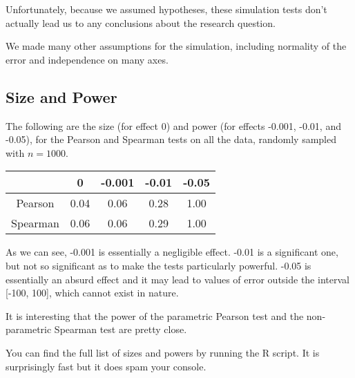 \documentclass[11pt, oneside]{article}
\begin{document}
Unfortunately, because we assumed hypotheses, these simulation tests don't actually lead us to any conclusions about the research question. 

We made many other assumptions for the simulation, including normality of the error and independence on many axes. 

\subsection{Size and Power}

The following are the size (for effect 0) and power (for effects -0.001, -0.01, and -0.05), for the Pearson and Spearman tests on all the data, randomly sampled with $n = 1000$. 

\begin{center}
 \begin{tabular}{|c|c c c c|} 
 \hline
 & 0 & -0.001 & -0.01 & -0.05 \\  
 \hline
 Pearson& 0.04 & 0.06 & 0.28 & 1.00 \\ 
 \hline
 Spearman & 0.06 & 0.06 & 0.29 & 1.00 \\
 \hline
 \end{tabular}
\end{center}

As we can see, -0.001 is essentially a negligible effect. -0.01 is a significant one, but not so significant as to make the tests particularly powerful. -0.05 is essentially an absurd effect and it may lead to values of error outside the interval [-100, 100], which cannot exist in nature. 

It is interesting that the power of the parametric Pearson test and the non-parametric Spearman test are pretty close. 

You can find the full list of sizes and powers by running the R script. It is surprisingly fast but it does spam your console. 




\end{document}
